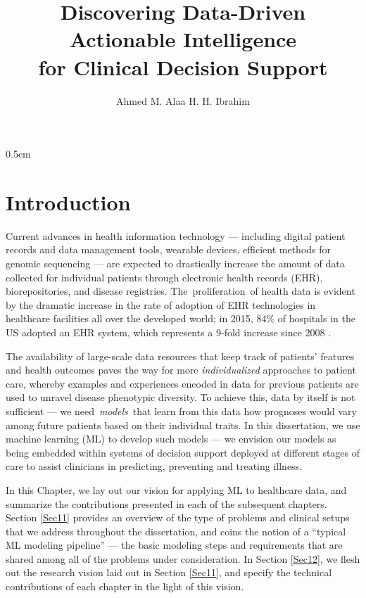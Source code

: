 \documentclass [PhD] {uclathes}
\title          {Discovering Data-Driven Actionable Intelligence\\
for Clinical Decision Support}
\author         {Ahmed M. Alaa H. H. Ibrahim}
\begin{document}
\makeintropages

%
%

\openup 0.5em

\chapter{Introduction}
Current advances in health information technology --- including digital patient records and data management tools, wearable devices, efficient methods for genomic sequencing --- are expected to drastically increase the amount of data collected for individual patients through electronic health records (EHR), biorepositories, and disease registries. The~proliferation~of health data is evident by the dramatic increase in the rate of adoption of EHR technologies in healthcare facilities all over the developed world; in 2015, 84$\%$ of hospitals in the US adopted an EHR system, which represents a 9-fold increase since 2008 \cite{desalvo2015us}.

The availability of large-scale data resources that keep track of patients' features and health outcomes paves the way for more \textit{individualized} approaches to patient care, whereby examples and experiences encoded in data for previous patients are used to unravel disease phenotypic diversity. To achieve this, data by itself is not sufficient --- we need~\textit{models}~that learn from this data how prognoses would vary among future patients based on their individual traits. In this dissertation, we use machine learning (ML) to develop such models --- we envision our models as being embedded within systems of decision support deployed at different stages of care to assist clinicians in predicting, preventing and treating illness. 

In this Chapter, we lay out our vision for applying ML to healthcare data, and summarize the contributions presented in each of the subsequent chapters. Section \ref{Sec11} provides an overview of the type of problems and clinical setups that we address throughout the dissertation, and coins the notion of a ``typical ML modeling pipeline'' --- the basic modeling steps and requirements that are shared among all of the problems under consideration. In Section \ref{Sec12}, we flesh out the research vision laid out in Section \ref{Sec11}, and specify the technical contributions of each chapter in the light of this vision.  
\end{document}
